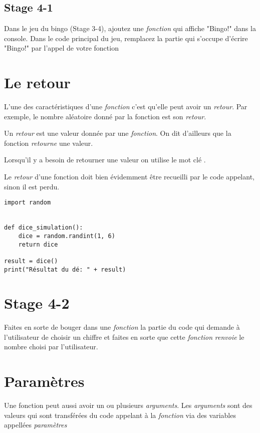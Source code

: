 \subsection{Stage 4-1}

Dans le jeu du bingo (Stage 3-4), ajoutez une \emph{fonction}  qui affiche "Bingo!" dans la console.
Dans le code principal du jeu, remplacez la partie qui s'occupe d'écrire "Bingo!" par l'appel de votre fonction

\section{Le retour}

L'une des caractéristiques d'une \emph{fonction} c'est qu'elle peut avoir un \emph{retour}.
Par exemple, le nombre aléatoire donné par la fonction  est son \emph{retour}.

Un \emph{retour} est une valeur donnée par une \emph{fonction}. On dit d'ailleurs que la fonction \emph{retourne} une valeur.

Lorsqu'il y a besoin de retourner une valeur on utilise le mot clé .

Le \emph{retour} d'une fonction doit bien évidemment être recueilli par le code appelant, sinon il est perdu.

\begin{lstlisting}
import random


def dice_simulation():
	dice = random.randint(1, 6)
	return dice
	
result = dice()
print("Résultat du dé: " + result)	
\end{lstlisting}

\section{Stage 4-2}
Faites en sorte de bouger dans une \emph{fonction} la partie du code qui demande à l'utilisateur de choisir un chiffre et faites en sorte que cette \emph{fonction} \emph{renvoie} le nombre choisi par l'utilisateur.

\section{Paramètres}

Une fonction peut aussi avoir un ou plusieurs \emph{arguments}. Les \emph{arguments} sont des valeurs qui sont transférées du code appelant à la \emph{fonction} via des variables appellées \emph{paramètres}

